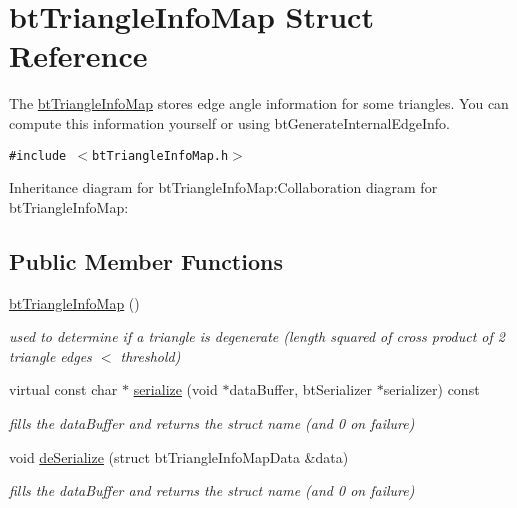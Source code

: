 \hypertarget{structbt_triangle_info_map}{
\section{btTriangleInfoMap Struct Reference}
\label{structbt_triangle_info_map}
}
The \hyperlink{structbt_triangle_info_map}{btTriangleInfoMap} stores edge angle information for some triangles. You can compute this information yourself or using btGenerateInternalEdgeInfo.  


{\tt \#include $<$btTriangleInfoMap.h$>$}

Inheritance diagram for btTriangleInfoMap:Collaboration diagram for btTriangleInfoMap:\subsection*{Public Member Functions}
\begin{CompactItemize}
\item 
\hypertarget{structbt_triangle_info_map_60e9096e47e52a03e29004e77d9dd572}{
\hyperlink{structbt_triangle_info_map_60e9096e47e52a03e29004e77d9dd572}{btTriangleInfoMap} ()}
\label{structbt_triangle_info_map_60e9096e47e52a03e29004e77d9dd572}

\begin{CompactList}\small\item\em used to determine if a triangle is degenerate (length squared of cross product of 2 triangle edges $<$ threshold) \item\end{CompactList}\item 
\hypertarget{structbt_triangle_info_map_04271020827a5cf802def85945d65028}{
virtual const char $\ast$ \hyperlink{structbt_triangle_info_map_04271020827a5cf802def85945d65028}{serialize} (void $\ast$dataBuffer, btSerializer $\ast$serializer) const }
\label{structbt_triangle_info_map_04271020827a5cf802def85945d65028}

\begin{CompactList}\small\item\em fills the dataBuffer and returns the struct name (and 0 on failure) \item\end{CompactList}\item 
\hypertarget{structbt_triangle_info_map_729483561a5100a27dae3f92fe57ebca}{
void \hyperlink{structbt_triangle_info_map_729483561a5100a27dae3f92fe57ebca}{deSerialize} (struct btTriangleInfoMapData \&data)}
\label{structbt_triangle_info_map_729483561a5100a27dae3f92fe57ebca}

\begin{CompactList}\small\item\em fills the dataBuffer and returns the struct name (and 0 on failure) \item\end{CompactList}\end{CompactItemize}
